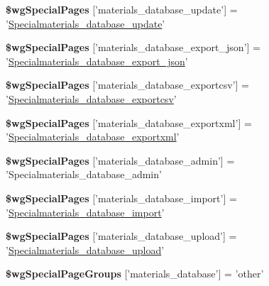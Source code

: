 \begin{DoxyCompactItemize}
\item 
\hypertarget{materials__database_8php_afed30e249d964682c92803d7c0b4bf34}{{\bfseries \$wg\+Special\+Pages} \mbox{[}'materials\+\_\+database\+\_\+update'\mbox{]} = '\hyperlink{classSpecialmaterials__database__update}{Specialmaterials\+\_\+database\+\_\+update}'}\label{materials__database_8php_afed30e249d964682c92803d7c0b4bf34}

\item 
\hypertarget{materials__database_8php_a2e96cd03382e0aff159e621e2cfc8fa3}{{\bfseries \$wg\+Special\+Pages} \mbox{[}'materials\+\_\+database\+\_\+export\+\_\+json'\mbox{]} = '\hyperlink{classSpecialmaterials__database__export__json}{Specialmaterials\+\_\+database\+\_\+export\+\_\+json}'}\label{materials__database_8php_a2e96cd03382e0aff159e621e2cfc8fa3}

\item 
\hypertarget{materials__database_8php_ac24bba5e41342814dc4d921d2478cdf5}{{\bfseries \$wg\+Special\+Pages} \mbox{[}'materials\+\_\+database\+\_\+exportcsv'\mbox{]} = '\hyperlink{classSpecialmaterials__database__exportcsv}{Specialmaterials\+\_\+database\+\_\+exportcsv}'}\label{materials__database_8php_ac24bba5e41342814dc4d921d2478cdf5}

\item 
\hypertarget{materials__database_8php_aac68d0f57a9ebbb7fe83e184ff41a878}{{\bfseries \$wg\+Special\+Pages} \mbox{[}'materials\+\_\+database\+\_\+exportxml'\mbox{]} = '\hyperlink{classSpecialmaterials__database__exportxml}{Specialmaterials\+\_\+database\+\_\+exportxml}'}\label{materials__database_8php_aac68d0f57a9ebbb7fe83e184ff41a878}

\item 
\hypertarget{materials__database_8php_ae9d6ed974708647a2ab60644d38c1bd0}{{\bfseries \$wg\+Special\+Pages} \mbox{[}'materials\+\_\+database\+\_\+admin'\mbox{]} = 'Specialmaterials\+\_\+database\+\_\+admin'}\label{materials__database_8php_ae9d6ed974708647a2ab60644d38c1bd0}

\item 
\hypertarget{materials__database_8php_af541a33744dee64ad05843a5dc833837}{{\bfseries \$wg\+Special\+Pages} \mbox{[}'materials\+\_\+database\+\_\+import'\mbox{]} = '\hyperlink{classSpecialmaterials__database__import}{Specialmaterials\+\_\+database\+\_\+import}'}\label{materials__database_8php_af541a33744dee64ad05843a5dc833837}

\item 
\hypertarget{materials__database_8php_aea20076dd9975120c9c21317058f3a7b}{{\bfseries \$wg\+Special\+Pages} \mbox{[}'materials\+\_\+database\+\_\+upload'\mbox{]} = '\hyperlink{classSpecialmaterials__database__upload}{Specialmaterials\+\_\+database\+\_\+upload}'}\label{materials__database_8php_aea20076dd9975120c9c21317058f3a7b}

\item 
\hypertarget{materials__database_8php_aaed443bcecefc1696ae8bb8dbf2b286b}{{\bfseries \$wg\+Special\+Page\+Groups} \mbox{[}'materials\+\_\+database'\mbox{]} = 'other'}\label{materials__database_8php_aaed443bcecefc1696ae8bb8dbf2b286b}

\end{DoxyCompactItemize}


